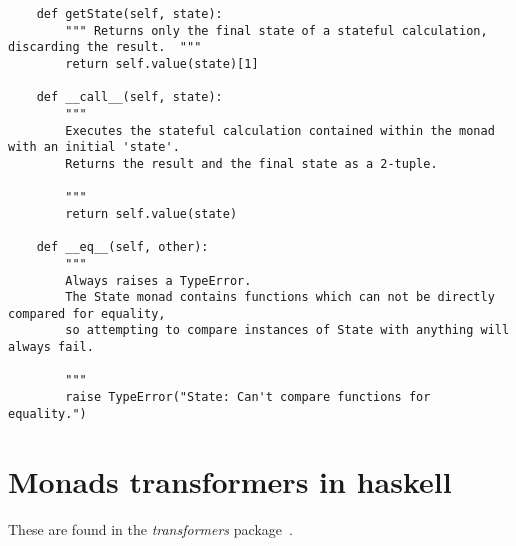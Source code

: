 \begin{lstlisting}
	def getState(self, state):
		""" Returns only the final state of a stateful calculation, discarding the result.  """
		return self.value(state)[1]

	def __call__(self, state):
		"""
		Executes the stateful calculation contained within the monad with an initial 'state'.
		Returns the result and the final state as a 2-tuple.

		"""
		return self.value(state)

	def __eq__(self, other):
		"""
		Always raises a TypeError.
		The State monad contains functions which can not be directly compared for equality,
		so attempting to compare instances of State with anything will always fail.

		"""
		raise TypeError("State: Can't compare functions for equality.")
\end{lstlisting}


\chapter{Monads transformers in haskell}\label{app:monadshaskell}
These are found in the \emph{transformers} package~\cite{http://hackage.haskell.org/package/transformers}.

